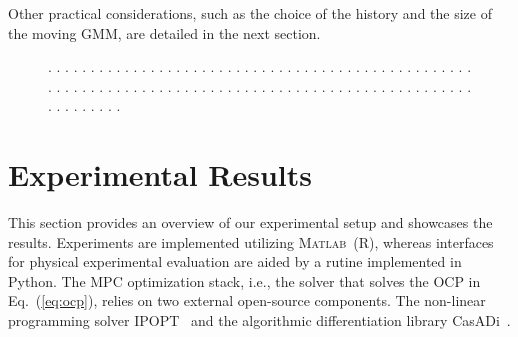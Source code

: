 \documentclass[letterpaper,10pt,conference,twoside]{IEEEtran}
\theoremstyle{definition}
\begin{document}
Other practical considerations, such as the choice of the history and the size of the moving GMM, are detailed in the next section.


\begin{figure}[t!]
  \begin{minipage}[t!]{.25\columnwidth}
    \caption[.]{\textbf{.   }.   .   .   .   .   .   .   .   .   .   .   .   .   .   .   .   .   .   .   .   .   .   .   .   .   .   .   .   .   .   .   .   .   .   .   .   .   .   .   .   .   .   .   .   .   .   .   .   .   .   .   .   .   .   .   .   .   .   .   .   .   .   .   .   .   .   .   .   .   .   .   .   .   .   .   .   .   .   .   .   .   .   .   .   .   .   .   .   .   .   .   .   .   .   .   .   .   .   .   .   .   .   .   .   .   .   .   .   .   .   .   .   .   .   .   .   .   .   .   .   .   .   .   .   .   .   .   .   .   .   .   .   .   .   .   .   .   .   .   .   .   .   .   .   .   .   .   .   .   .   .   .   .   .   .   .   .   .   .   .   .   .   .   .   .   .   .   .   .   .   .   .   .   .   .   .   .   .   .   .   .   .   .   .   .   .   .   .   .   .   .   .   .   .   .   .   .   .   .   .   .   .   .   .   .   .   .   .   .   .   .   .   .   .   .   .   .   .   .   .   .   .   .   .   .   .   .   .   .   .   .   .   .   .   .   .   .   .   .   .   .   .   .   .   .   .   .   .   .   .   .   .   .   .   .   .   .   . }
    \label{fig:0}
  \end{minipage}\hspace*{.3cm}
  \begin{minipage}[t!]{.7\columnwidth}
    \vspace*{-.3cm}
    
  \end{minipage}
  \vspace*{-.4cm}
  \caption*{\footnotesize .   .   .   .   .   .   .   .   .   .   .   .   .   .   .   .   .   .   .   .   .   .   .   .   .   .   .   .   .   .   .   .   .   .   .   .   .   .   .   .   .   .   .   .   .   .   .   .   .   .   .   .   .   .   .   .   .   .   .   .   .   .   .   .   .   .   .   .   .   .   .   .   .   .   .   .   .   .   .   .   .   .   .   .   .   .   .   .   .   .   .   .   .   .   .   .   .   .   .   .   .   .   .   .   .   .   .   .   .}
\end{figure}

\section{Experimental Results}\label{sec:res}
\noindent
This section provides an overview of our experimental setup and showcases the results. 
Experiments are implemented utilizing \textsc{Matlab}~(R), whereas interfaces for physical experimental evaluation are aided by a rutine implemented in Python. 
The MPC optimization stack, i.e., the solver that solves the OCP in Eq.~(\ref{eq:ocp}), relies on two external open-source components. The non-linear programming solver IPOPT~\cite{wachter2006implementation} and the algorithmic differentiation library CasADi~\cite{andersson2012casadi}.
\end{document}

